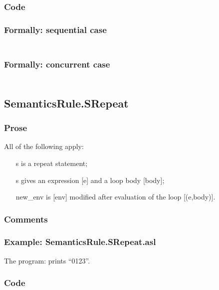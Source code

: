\documentclass{book}
\begin{document}
  \subsubsection{Code}

  \subsubsection{Formally: sequential case}
  \begin{align}
  \end{align} 

  \subsubsection{Formally: concurrent case}
  \begin{align}
  \end{align} 

\subsection{SemanticsRule.SRepeat \label{sec:SemanticsRule.SRepeat}}

    \subsubsection{Prose}
    All of the following apply:
    \begin{itemize}
    \item [s] is a repeat statement;
    \item [s] gives an expression [e] and a loop body [body];
    \item [new\_env] is [env] modified after evaluation of the loop [(e,body)].
    \end{itemize}

    \subsubsection{Comments}

    \subsubsection{Example: SemanticsRule.SRepeat.asl}
    The program:
    prints ``0123''.

  \subsubsection{Code}
\end{document}
